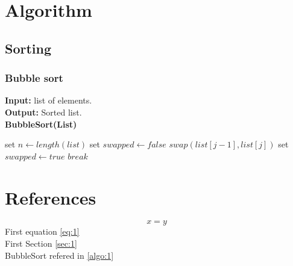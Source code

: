 \documentclass{report}
\begin{document}
    \chapter{Algorithm}
        \section{Sorting}
        \subsection{Bubble sort}
        \textbf{Input:} list of elements.\\
        \textbf{Output:} Sorted list.\\
        \textbf{BubbleSort(List)} \\
        \begin{algorithmic}[1] \label{algo:1}
            \STATE set $n \leftarrow length(list)$
            \STATE set $ swapped \leftarrow false $
            \STATE $swap(list[j-1],list[j])$
            \STATE set $ swapped \leftarrow true $
            \ENDIF
            \ENDFOR
            \STATE $break$
            \ENDIF
            \ENDFOR
        \end{algorithmic}

        \chapter{References}
            \begin{equation} 
                x =y
            \end{equation}
            First equation \ref{eq:1}
            \\
            First Section \ref{sec:1}
            \\
            BubbleSort refered in \ref{algo:1}
\end{document}
